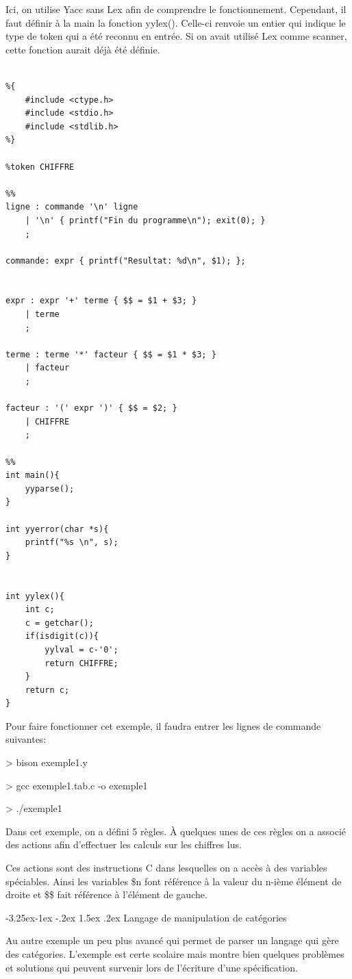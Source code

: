 \documentclass{article}
\makeatletter
\newcounter {subsubsubsection}[subsubsection]
\newcommand\subsubsubsection{\@startsection{subsubsubsection}{4}{\z@}%
                                     {-3.25ex\@plus -1ex \@minus -.2ex}%
                                     {1.5ex \@plus .2ex}%
                                     {\normalfont\normalsize\bfseries}}
\makeatother
\begin{document}
Ici, on utilise Yacc sans Lex afin de comprendre le fonctionnement. Cependant, il faut définir à la main la fonction yylex(). Celle-ci renvoie un entier qui indique le type de token qui a été reconnu en entrée. Si on avait utilisé Lex comme scanner, cette fonction aurait déjà été définie.

\begin{verbatim}

%{
    #include <ctype.h>
    #include <stdio.h>
    #include <stdlib.h>
%}

%token CHIFFRE

%%
ligne : commande '\n' ligne
    | '\n' { printf("Fin du programme\n"); exit(0); }
    ;

commande: expr { printf("Resultat: %d\n", $1); };


expr : expr '+' terme { $$ = $1 + $3; }
    | terme
    ;
   
terme : terme '*' facteur { $$ = $1 * $3; }
    | facteur
    ;
   
facteur : '(' expr ')' { $$ = $2; }
    | CHIFFRE
    ;

%%
int main(){
    yyparse();   
}

int yyerror(char *s){
    printf("%s \n", s);
}


int yylex(){
    int c;
    c = getchar();
    if(isdigit(c)){
        yylval = c-'0';
        return CHIFFRE;
    }
    return c;
}

\end{verbatim}

Pour faire fonctionner cet exemple, il faudra entrer les lignes de commande suivantes:

> bison exemple1.y

> gcc exemple1.tab.c -o exemple1

> ./exemple1

Dans cet exemple, on a défini 5 règles. À quelques unes de ces règles on a associé des actions afin d’effectuer les calculs sur les chiffres lus.

Ces actions sont des instructions C dans lesquelles on a accès à des variables spéciables.
Ainsi les variables \$n font référence à la valeur du n-ième élément de droite et \$\$ fait référence à l’élément de gauche.


\subsubsubsection{ Langage de manipulation de catégories }

Au autre exemple un peu plus avancé qui permet de parser un langage qui gère des catégories. L'exemple est certe scolaire mais montre bien quelques problèmes et solutions qui peuvent survenir lors de l'écriture d'une spécification.
\end{document}
